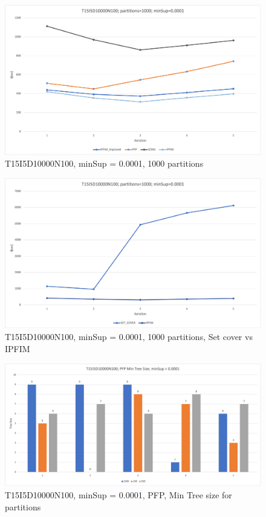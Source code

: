 \begin{figure}
  \centering
  \includegraphics[width=\linewidth]{figures/4iterations/T15I5D10000N100_1000part_0001}
  \caption{T15I5D10000N100, minSup = 0.0001,  1000 partitions}
  \label{fig:T15I5D10000N100_1000part_0001}
\end{figure}

\begin{figure}
  \centering
  \includegraphics[width=\linewidth]{figures/4iterations/T15I5D10000N100_1000part_SETCOVER_0001}
  \caption{T15I5D10000N100, minSup = 0.0001,  1000 partitions, Set cover vs IPFIM}
  \label{fig:T15I5D10000N100_1000part_SETCOVER_0001}
\end{figure}



\begin{figure}
  \centering
  \includegraphics[width=\linewidth]{figures/4iterations/T15I5D10000N100_MinTree_PFP_0001}
  \caption{T15I5D10000N100, minSup = 0.0001,  PFP, Min Tree size for partitions}
  \label{fig:T15I5D10000N100_MinTree_PFP_0001}
\end{figure}

